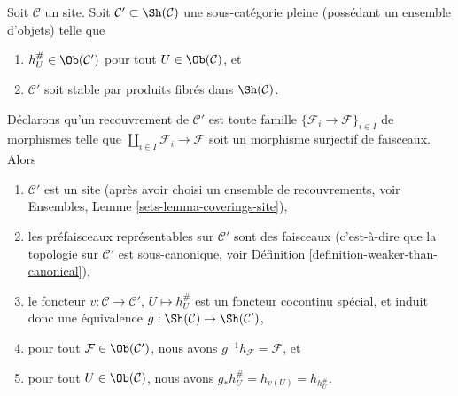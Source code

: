 \begin{lemma}
\label{lemma-special-equivalence}
Soit $\mathcal{C}$ un site. Soit
$\mathcal{C}' \subset \Sh(\mathcal{C})$
une sous-catégorie pleine (possédant un ensemble d’objets) telle que
\begin{enumerate}
\item $h_U^\# \in \Ob(\mathcal{C}')$ pour tout
$U \in \Ob(\mathcal{C})$, et
\item $\mathcal{C}'$ soit stable par produits fibrés dans
$\Sh(\mathcal{C})$.
\end{enumerate}
Déclarons qu’un recouvrement de $\mathcal{C}'$ est toute famille
$\{\mathcal{F}_i \to \mathcal{F}\}_{i \in I}$ de morphismes telle que
$\coprod_{i \in I} \mathcal{F}_i \to \mathcal{F}$ soit un morphisme surjectif
de faisceaux. Alors
\begin{enumerate}
\item $\mathcal{C}'$ est un site (après avoir
choisi un ensemble de recouvrements, voir Ensembles, Lemme \ref{sets-lemma-coverings-site}),
\item les préfaisceaux représentables sur $\mathcal{C}'$ sont des faisceaux
(c’est-à-dire que la topologie sur $\mathcal{C}'$ est sous-canonique, voir
Définition \ref{definition-weaker-than-canonical}),
\item le foncteur $v : \mathcal{C} \to \mathcal{C}'$,
$U \mapsto h_U^\#$ est un foncteur cocontinu spécial, et induit donc une
équivalence $g : \Sh(\mathcal{C}) \to \Sh(\mathcal{C}')$,
\item pour tout $\mathcal{F} \in \Ob(\mathcal{C}')$, nous avons
$g^{-1}h_\mathcal{F} = \mathcal{F}$, et
\item pour tout $U \in \Ob(\mathcal{C})$, nous avons
$g_*h_U^\# = h_{v(U)} = h_{h_U^\#}$.
\end{enumerate}
\end{lemma}

